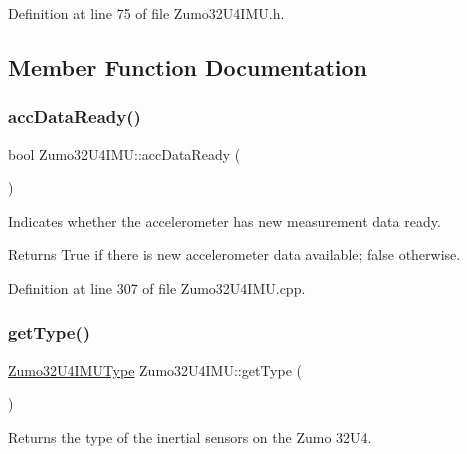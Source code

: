 Definition at line 75 of file Zumo32\+U4\+I\+M\+U.\+h.



\subsection{Member Function Documentation}
\mbox{\label{class_zumo32_u4_i_m_u_a75735024206bd09d0905f28455f0a368}} 
\subsubsection{\texorpdfstring{acc\+Data\+Ready()}{accDataReady()}}
{\footnotesize\ttfamily bool Zumo32\+U4\+I\+M\+U\+::acc\+Data\+Ready (\begin{DoxyParamCaption}{ }\end{DoxyParamCaption})}



Indicates whether the accelerometer has new measurement data ready. 

\begin{DoxyReturn}{Returns}
True if there is new accelerometer data available; false otherwise. 
\end{DoxyReturn}


Definition at line 307 of file Zumo32\+U4\+I\+M\+U.\+cpp.

\mbox{\label{class_zumo32_u4_i_m_u_a936427abfbed839c5669746d274427bd}} 
\subsubsection{\texorpdfstring{get\+Type()}{getType()}}
{\footnotesize\ttfamily \hyperlink{_zumo32_u4_i_m_u_8h_a2be3e50a86f638af5bb120cc740f3452}{Zumo32\+U4\+I\+M\+U\+Type} Zumo32\+U4\+I\+M\+U\+::get\+Type (\begin{DoxyParamCaption}{ }\end{DoxyParamCaption})\hspace{0.3cm}{\ttfamily [inline]}}



Returns the type of the inertial sensors on the Zumo 32\+U4. 

